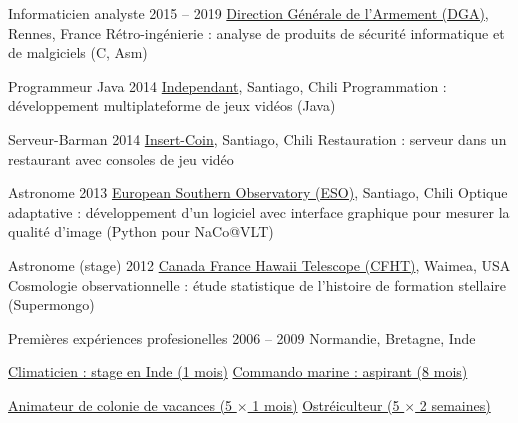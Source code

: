 \begin{joblist}[12.8][8.4][4]

\setlength{\parskip}{0.1cm}
\vspace{-0.4cm}

\item[Informaticien analyste]{2015 -- 2019}
	{
  \href{http://www.defense.gouv.fr/dga/}{Direction Générale de l'Armement (DGA)}, Rennes, France
  }
  {Rétro-ingénierie : analyse de produits de sécurité informatique et de malgiciels (C, Asm)}

\item[Programmeur Java]{2014}
	{
	\href{https://tinmarino.github.io/Page/}{Independant}, Santiago, Chili
  }
  {Programmation : développement multiplateforme de jeux vidéos (Java)}


\item[Serveur-Barman]{2014}
	{
	\href{http://www.insertcoin.cl/}{Insert-Coin}, Santiago, Chili
  }
	{Restauration : serveur dans un restaurant avec consoles de jeu vidéo}


\item[Astronome]{2013}
	{
	\href{http://www.eso.org/public/}{European Southern Observatory (ESO)}, Santiago, Chili
	}
  {Optique adaptative : développement d'un logiciel avec interface graphique pour mesurer la qualité d'image (Python pour NaCo@VLT)}


\item[Astronome (stage)]{2012}
	{
\href{https://www.cfht.hawaii.edu/}{Canada France Hawaii Telescope (CFHT)}, Waimea, USA
  }
  {Cosmologie observationnelle : étude statistique de l'histoire de formation stellaire (Supermongo)}

\item[Premières expériences profesionelles]{2006 -- 2009}
	{
	Normandie, Bretagne, Inde
	}
	{
    \renewcommand\labelitemi{{}}
		\vspace{-0.8cm}
    \setlength{\parskip}{0cm}
		\begin{itemize}
		\setlength\itemsep{0cm}
    \cvitem \href{http://www.dupont.co.in/}{ Climaticien : stage en Inde (1 mois)}
    \cvitem \href{http://www.defense.gouv.fr/marine/organisation/forces/fusiliers-marins-et-commandos/force-maritime-des-fusiliers-marins-et-commandos}{ Commando marine : aspirant (8 mois)}
	
    \cvitem \href{http://www.vacances-pour-tous.org/}{ Animateur de colonie de vacances (5 $\times$ 1 mois)}
    \cvitem \href{http://huitresdesaintvaast.fr/}{ Ostréiculteur (5 $\times$ 2 semaines)}
		\end{itemize}
  }
\end{joblist}



